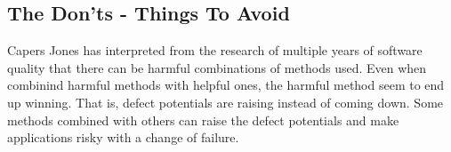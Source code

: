 
\subsection{The Don'ts - Things To Avoid}



Capers Jones has interpreted from the research of multiple years of software quality that there can be harmful combinations of methods used. Even when combinind harmful methods with helpful ones, the harmful method seem to end up winning. That is, defect potentials are raising instead of coming down. Some methods combined with others can raise the defect potentials and make applications risky with a change of failure.
